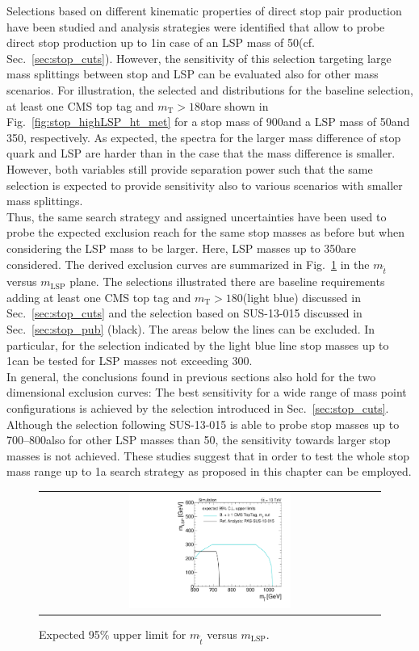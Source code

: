Selections based on different kinematic properties of direct stop pair production have been studied and analysis strategies were identified that allow to probe direct stop production up to 1\tev in case of an LSP mass of 50\gev (cf. Sec.~\ref{sec:stop_cuts}). However, the sensitivity of this selection targeting large mass splittings between stop and LSP can be evaluated also for other mass scenarios. For illustration, the selected \HT and \met distributions for the baseline selection, at least one CMS top tag and $m_\mathrm{T} > 180$\gev are shown in Fig.~\ref{fig:stop_highLSP_ht_met} for a stop mass of 900\gev and a LSP mass of 50\gev and 350\gev, respectively. As expected, the spectra for the larger mass difference of stop quark and LSP are harder than in the case that the mass difference is smaller. However, both variables still provide separation power such that the same selection is expected to provide sensitivity also to various scenarios with smaller mass splittings. \\
Thus, the same search strategy and assigned uncertainties have been used to probe the expected exclusion reach for the same stop masses as before but when considering the LSP mass to be larger. Here, LSP masses up to 350\gev are considered. The derived exclusion curves are summarized in Fig.~\ref{fig:stop_2Dlimit} in the $m_{\tilde{t}}$ versus $m_\mathrm{LSP}$ plane. The selections illustrated there are baseline requirements adding at least one CMS top tag and $m_\mathrm{T} > 180$\gev (light blue) discussed in Sec.~\ref{sec:stop_cuts} and the selection based on SUS-13-015 discussed in Sec.~\ref{sec:stop_pub} (black). The areas below the lines can be excluded. In particular, for the selection indicated by the light blue line stop masses up to 1\tev can be tested for LSP masses not exceeding 300\gev. \\
In general, the conclusions found in previous sections also hold for the two dimensional exclusion curves: The best sensitivity for a wide range of mass point configurations is achieved by the selection introduced in Sec.~\ref{sec:stop_cuts}. Although the selection following SUS-13-015 is able to probe stop masses up to 700--800\gev also for other LSP masses than 50\gev, the sensitivity towards larger stop masses is not achieved. These studies suggest that in order to test the whole stop mass range up to 1\tev a search strategy as proposed in this chapter can be employed. 
\begin{figure}[!h]
  \centering
  \begin{tabular}{c}
                \includegraphics[width=0.49\textwidth]{figures/2Dlimitplot.pdf} 
  \end{tabular}
  \caption{Expected 95\% upper limit for $m_{\tilde{t}}$ versus $m_\mathrm{LSP}$.}
  \label{fig:stop_2Dlimit}
\end{figure}
